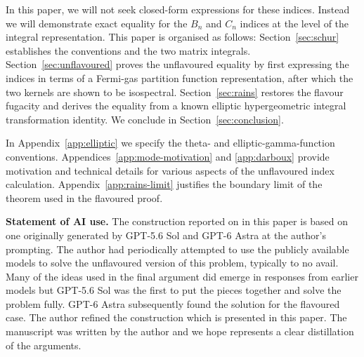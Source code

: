 In this paper, we will not seek closed-form expressions for these indices.
Instead we will demonstrate exact equality for the $B_n$ and $C_n$ indices at
the level of the integral representation. This paper is organised as follows:
Section~\ref{sec:schur} establishes the conventions and the two matrix
integrals. Section~\ref{sec:unflavoured} proves the unflavoured equality by
first expressing the indices in terms of a Fermi-gas partition function
representation, after which the two kernels are shown to be isospectral.
Section~\ref{sec:rains} restores the flavour fugacity and derives the equality
from a known elliptic hypergeometric integral transformation identity. We
conclude in Section~\ref{sec:conclusion}.

In Appendix~\ref{app:elliptic} we specify the theta- and
elliptic-gamma-function conventions. Appendices~\ref{app:mode-motivation} and
\ref{app:darboux} provide motivation and technical details for various aspects
of the unflavoured index calculation. Appendix~\ref{app:rains-limit} justifies
the boundary limit of the theorem used in the flavoured proof.

\textbf{Statement of AI use.} The construction reported on in this paper is
based on one originally generated by GPT-5.6 Sol and GPT-6 Astra at the author's
prompting. The author had periodically attempted to use the publicly available
models to solve the unflavoured version of this problem, typically to no avail.
Many of the ideas used in the final argument did emerge in responses from
earlier models but GPT-5.6 Sol was the first to put the pieces together and
solve the problem fully. GPT-6 Astra subsequently found the solution for the
flavoured case. The author refined the construction which is presented in this
paper. The manuscript was written by the author and we hope represents a clear
distillation of the arguments.
